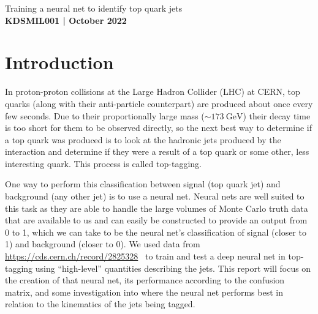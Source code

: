 \documentclass[11pt]{article}
\numberwithin{equation}{section}
\numberwithin{figure}{section}
\numberwithin{table}{section}
\begin{document}
\begin{center}
    {\huge Training a neural net to identify top quark jets}\\
    \vspace{0.2in}
    \textbf{KDSMIL001 | October 2022}    
    
    \begin{abstract}
        We train a neural net to identify jets as originating from top quarks as opposed to other quarks; a process known as top tagging. High-level variables describing the jets are used as opposed to constituent data as constituent requires considerably more computing power. The model's performance is then assessed according to some commonly used statistics and investigated for different $p_\mathrm{T}$ cuts.
    \end{abstract}
\end{center}

\section{Introduction}\label{sec:Introduction}
In proton-proton collisions at the Large Hadron Collider (LHC) at CERN, top quarks (along with their anti-particle counterpart) are produced about once every few seconds. Due to their proportionally large mass ($\sim\SI{173}{\giga\electronvolt}$) their decay time is too short for them to be observed directly, so the next best way to determine if a top quark was produced is to look at the hadronic jets produced by the interaction and determine if they were a result of a top quark or some other, less interesting quark. This process is called top-tagging.

One way to perform this classification between signal (top quark jet) and background (any other jet) is to use a neural net. Neural nets are well suited to this task as they are able to handle the large volumes of Monte Carlo truth data that are available to us and can easily be constructed to provide an output from 0 to 1, which we can take to be the neural net's classification of signal (closer to 1) and background (closer to 0). We used data from \url{https://cds.cern.ch/record/2825328}~\cite{top-tagging-data} to train and test a deep neural net in top-tagging using ``high-level'' quantities describing the jets. This report will focus on the creation of that neural net, its performance according to the confusion matrix, and some investigation into where the neural net performs best in relation to the kinematics of the jets being tagged. 
\end{document}
